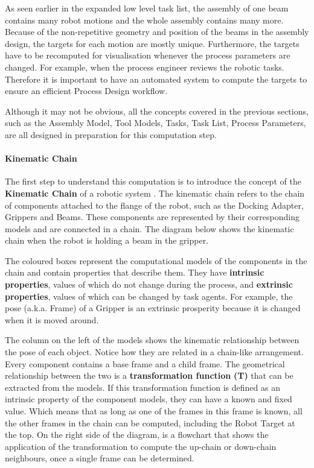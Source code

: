 As seen earlier in the expanded low level task list, the assembly of one beam contains many robot motions and the whole assembly contains many more. Because of the non-repetitive geometry and position of the beams in the assembly design, the targets for each motion are mostly unique. Furthermore, the targets have to be recomputed for visualisation whenever the process parameters are changed. For example, when the process engineer reviews the robotic tasks. Therefore it is important to have an automated system to compute the targets to ensure an efficient Process Design workflow.

Although it may not be obvious, all the concepts covered in the previous sections, such as the Assembly Model, Tool Models, Tasks, Task List, Process Parameters, are all designed in preparation for this computation step. 




\paragraph{Kinematic Chain}

The first step to understand this computation is to introduce the concept of the \textbf{Kinematic Chain} of a robotic system \parencite{lavallePlanningAlgorithms2006}. The kinematic chain refers to the chain of components attached to the flange of the robot, such as the Docking Adapter, Grippers and Beams. These components are represented by their corresponding models and are connected in a chain. The diagram below shows the kinematic chain when the robot is holding a beam in the gripper. 




The coloured boxes represent the computational models of the components in the chain and contain properties that describe them. They have \textbf{intrinsic properties}, values of which do not change during the process, and \textbf{extrinsic properties}, values of which can be changed by task agents. For example, the pose (a.k.a. Frame) of a Gripper is an extrinsic prosperity because it is changed when it is moved around. 

The column on the left of the models shows the kinematic relationship between the pose of each object. Notice how they are related in a chain-like arrangement. Every component contains a base frame and a child frame. The geometrical relationship between the two is a \textbf{transformation function} \textbf{(T) }that can be extracted from the models. If this transformation function is defined as an intrinsic property of the component models, they can have a known and fixed value. Which means that as long as one of the frames in this frame is known, all the other frames in the chain can be computed, including the Robot Target at the top. On the right side of the diagram, is a flowchart that shows the application of the transformation to compute the up-chain or down-chain neighbours, once a single frame can be determined.

